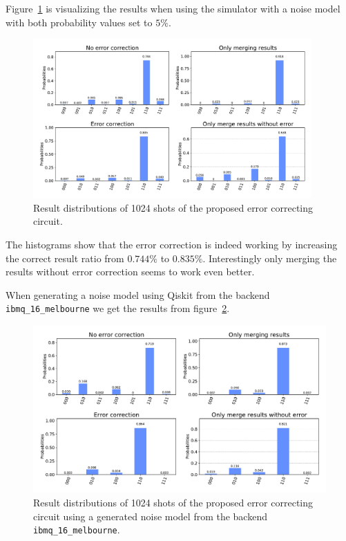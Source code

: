 Figure~\ref{fig:test-histogram-qec-results-noise-model} is visualizing the results when using the simulator with a noise model with both probability values set to \(5 \%\).

\begin{figure}[H]
    \centering
    \includegraphics[width=0.95\textwidth]{res/test-histogram-qec-results-noise-model.pdf}
    \caption{Result distributions of 1024 shots of the proposed error correcting circuit.}
    \label{fig:test-histogram-qec-results-noise-model}
\end{figure}

The histograms show that the error correction is indeed working by increasing the correct result ratio from \(0.744 \%\) to \(0.835 \%\).
Interestingly only merging the results without error correction seems to work even better.

When generating a noise model using Qiskit from the backend \texttt{ibmq\_16\_melbourne} we get the results from figure~\ref{fig:test-histogram-qec-results-noise-model-generated}.

\begin{figure}[H]
    \centering
    \includegraphics[width=\textwidth]{res/test-histogram-qec-results-noise-model-generated.pdf}
    \caption{Result distributions of 1024 shots of the proposed error correcting circuit using a generated noise model from the backend \texttt{ibmq\_16\_melbourne}.}
    \label{fig:test-histogram-qec-results-noise-model-generated}
\end{figure}

